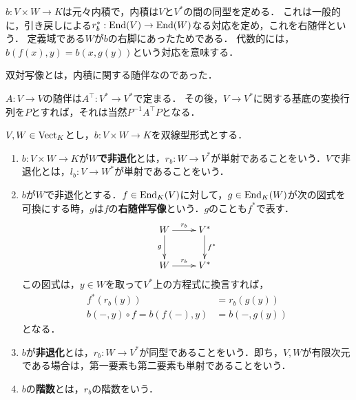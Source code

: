 \documentclass[uplatex,dvipdfmx]{jsreport}
\begin{document}
\begin{tcolorbox}[colframe=ForestGreen, colback=ForestGreen!10!white, breakable]
    $b:V\times W\to K$は元々内積で，内積は$V$と$V^*$の間の同型を定める．
    これは一般的に，引き戻しによる$r_b^*:\mathrm{End}(V)\to\mathrm{End}(W)$なる対応を定め，これを右随伴という．
    定義域である$W$が$b$の右脚にあったためである．
    代数的には，$b(f(x),y)=b(x,g(y))$という対応を意味する．

    双対写像とは，内積に関する随伴なのであった．

    $A:V\to V$の随伴は$A^\top:V^*\to V^*$で定まる．
    その後，$V\to V^*$に関する基底の変換行列を$P$とすれば，それは当然$P^{-1}A^\top P$となる．
\end{tcolorbox}

\begin{definition}
    $V,W\in\mathrm{Vect}_K$とし，$b:V\times W\to K$を双線型形式とする．
    \begin{enumerate}
        \item $b:V\times W\to K$が\textbf{$W$で非退化}とは，$r_b:W\to V^*$が単射であることをいう．$V$で非退化とは，$l_b:V\to W^*$が単射であることをいう．
        \item $b$が$W$で非退化とする．$f\in\mathrm{End}_K(V)$に対して，$g\in\mathrm{End}_K(W)$が次の図式を可換にする時，$g$は$f$の\textbf{右随伴写像}という．$g$のことも$f^*$で表す．
        \[\xymatrix{
            W\ar[r]^-{r_b}\ar[d]_-g&V^*\ar[d]^-{f^*}\\
            W\ar[r]^-{r_b}&V^*
        }\]
        この図式は，$y\in W$を取って$V^*$上の方程式に換言すれば，
        \begin{align*}
            f^*(r_b(y))&=r_b(g(y))\\
            b(-,y)\circ f=b(f(-),y)&=b(-,g(y))
        \end{align*}
        となる．
        \item $b$が\textbf{非退化}とは，$r_b:W\to V^*$が同型であることをいう．即ち，$V,W$が有限次元である場合は，第一要素も第二要素も単射であることをいう．
        \item $b$の\textbf{階数}とは，$r_b$の階数をいう．
    \end{enumerate}
\end{definition}
\end{document}
